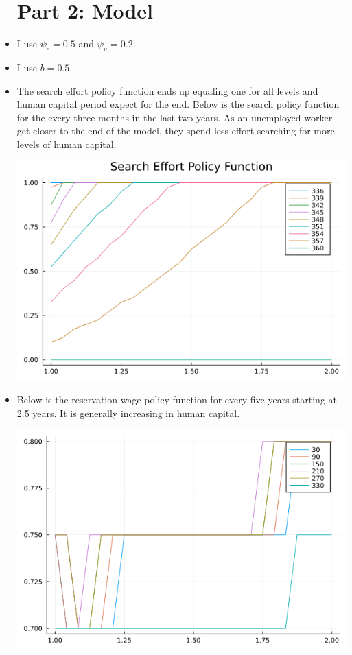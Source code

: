 \documentclass{article}
\begin{document}
\begin{itemize}
\pagebreak

\section{Part 2: Model}

\item I use $\psi_e = 0.5$ and $\psi_u = 0.2$.

\item I use $b = 0.5$.

\item The search effort policy function ends up equaling one for all levels and human capital period expect for the end.  Below is the search policy function for the every three months in the last two years.  As an unemployed worker get closer to the end of the model, they spend less effort searching for more levels of human capital.

\includegraphics[scale=0.5]{search_pf}

\item Below is the reservation wage policy function for every five years starting at 2.5 years.  It is generally increasing in human capital.

\includegraphics[scale = 0.5]{reservation_wage_pf}


\end{itemize}
\end{document}
